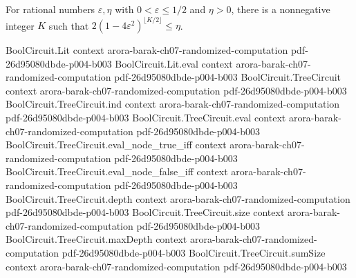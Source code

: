 \begin{theorem}
\label{Randomized.exists_majority_count}
\leanok
{}
For rational numbers $\varepsilon,\eta$ with $0<\varepsilon\le 1/2$ and $\eta>0$, there
is a nonnegative integer $K$ such that $2(1-4\varepsilon^2)^{\lfloor
K/2\rfloor}\le\eta$.
\end{theorem}

\begin{theorem}
\label{Randomized.BPP_PTMWith_const_eq_BPP_PTM}
\leanok
{}
\proofstep
  {BoolCircuit.Lit}
  {context}
  {arora-barak-ch07-randomized-computation}
  {pdf-26d95080dbde-p004-b003}
\proofstep
  {BoolCircuit.Lit.eval}
  {context}
  {arora-barak-ch07-randomized-computation}
  {pdf-26d95080dbde-p004-b003}
\proofstep
  {BoolCircuit.TreeCircuit}
  {context}
  {arora-barak-ch07-randomized-computation}
  {pdf-26d95080dbde-p004-b003}
\proofstep
  {BoolCircuit.TreeCircuit.ind}
  {context}
  {arora-barak-ch07-randomized-computation}
  {pdf-26d95080dbde-p004-b003}
\proofstep
  {BoolCircuit.TreeCircuit.eval}
  {context}
  {arora-barak-ch07-randomized-computation}
  {pdf-26d95080dbde-p004-b003}
\proofstep
  {BoolCircuit.TreeCircuit.eval_node_true_iff}
  {context}
  {arora-barak-ch07-randomized-computation}
  {pdf-26d95080dbde-p004-b003}
\proofstep
  {BoolCircuit.TreeCircuit.eval_node_false_iff}
  {context}
  {arora-barak-ch07-randomized-computation}
  {pdf-26d95080dbde-p004-b003}
\proofstep
  {BoolCircuit.TreeCircuit.depth}
  {context}
  {arora-barak-ch07-randomized-computation}
  {pdf-26d95080dbde-p004-b003}
\proofstep
  {BoolCircuit.TreeCircuit.size}
  {context}
  {arora-barak-ch07-randomized-computation}
  {pdf-26d95080dbde-p004-b003}
\proofstep
  {BoolCircuit.TreeCircuit.maxDepth}
  {context}
  {arora-barak-ch07-randomized-computation}
  {pdf-26d95080dbde-p004-b003}
\proofstep
  {BoolCircuit.TreeCircuit.sumSize}
  {context}
  {arora-barak-ch07-randomized-computation}
  {pdf-26d95080dbde-p004-b003}
\proofstep

\end{theorem}
